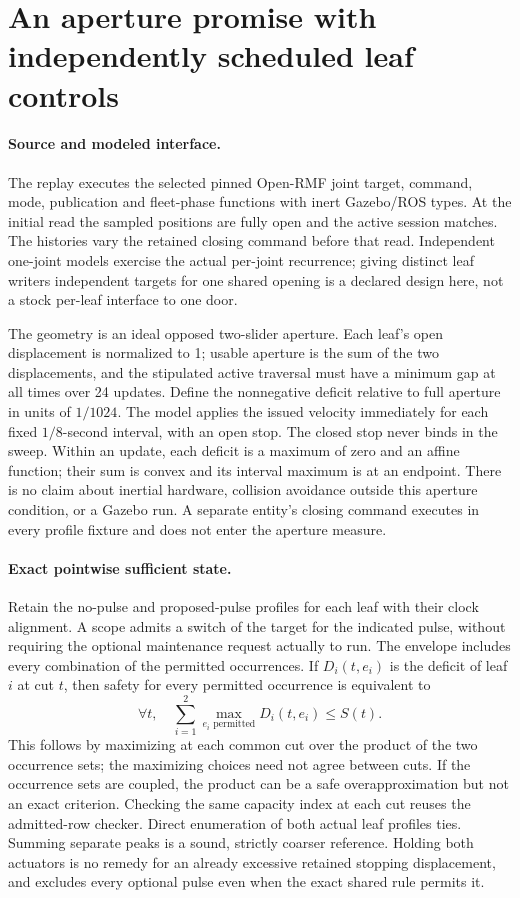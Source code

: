 \documentclass{article}
\begin{document}
\section*{An aperture promise with independently scheduled leaf controls}
\paragraph{Source and modeled interface.}
The replay executes the selected pinned Open-RMF joint target,
command, mode, publication and fleet-phase functions with inert
Gazebo/ROS types. At the initial read the sampled positions are
fully open and the active session matches. The histories vary the
retained closing command before that read. Independent one-joint
models exercise the actual per-joint recurrence; giving distinct
leaf writers independent targets for one shared opening is a
declared design here, not a stock per-leaf interface to one door.

The geometry is an ideal opposed two-slider aperture. Each leaf's
open displacement is normalized to 1; usable aperture is the sum
of the two displacements, and the stipulated active traversal must
have a minimum gap at all times over 24 updates. Define the
nonnegative deficit relative to full aperture in units of $1/1024$.
The model applies the issued velocity immediately for each fixed
$1/8$-second interval, with an open stop. The closed stop never
binds in the sweep. Within an update, each deficit is a maximum of
zero and an affine function; their sum is convex and its interval
maximum is at an endpoint. There is no claim about inertial
hardware, collision avoidance outside this aperture condition, or
a Gazebo run. A separate entity's closing command executes in every
profile fixture and does not enter the aperture measure.

\paragraph{Exact pointwise sufficient state.}
Retain the no-pulse and proposed-pulse profiles for each leaf with
their clock alignment. A scope admits a switch of the target for
the indicated pulse, without requiring the optional maintenance
request actually to run. The envelope includes every combination
of the permitted occurrences. If $D_i(t,e_i)$ is the deficit of
leaf $i$ at cut $t$, then safety for every permitted occurrence
is equivalent to
\[
  \forall t,\quad \sum_{i=1}^{2}\max_{e_i\text{ permitted}}D_i(t,e_i)\le S(t).
\]
This follows by maximizing at each common cut over the product of
the two occurrence sets; the maximizing choices need not agree
between cuts. If the occurrence sets are coupled, the product can
be a safe overapproximation but not an exact criterion. Checking
the same capacity index at each cut reuses the admitted-row
checker. Direct enumeration of both actual leaf profiles ties.
Summing separate peaks is a sound, strictly coarser reference.
Holding both actuators is no remedy for an already excessive
retained stopping displacement, and excludes every optional pulse
even when the exact shared rule permits it.
\end{document}
